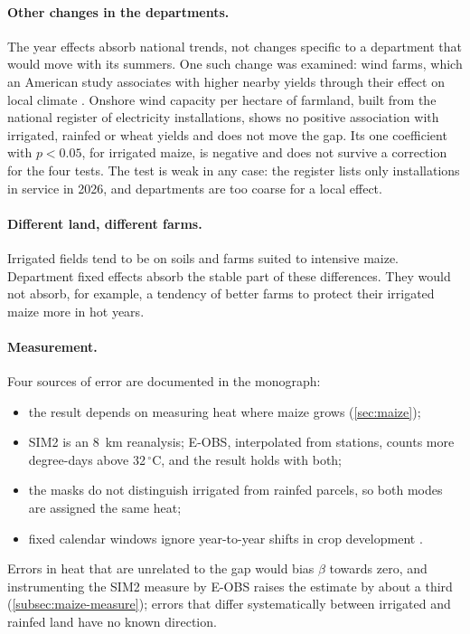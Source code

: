 \paragraph{Other changes in the departments.} The year effects absorb national trends, not changes specific to a department that would move with its summers. One such change was examined: wind farms, which an American study associates with higher nearby yields through their effect on local climate \parencite{kaffine2019}. Onshore wind capacity per hectare of farmland, built from the national register of electricity installations, shows no positive association with irrigated, rainfed or wheat yields and does not move the gap. Its one coefficient with $p < 0.05$, for irrigated maize, is negative and does not survive a correction for the four tests. The test is weak in any case: the register lists only installations in service in 2026, and departments are too coarse for a local effect.

\paragraph{Different land, different farms.} Irrigated fields tend to be on soils and farms suited to intensive maize. Department fixed effects absorb the stable part of these differences. They would not absorb, for example, a tendency of better farms to protect their irrigated maize more in hot years.

\paragraph{Measurement.} Four sources of error are documented in the monograph:
\begin{itemize}
  \item the result depends on measuring heat where maize grows (\cref{sec:maize});
  \item SIM2 is an 8~km reanalysis; E-OBS, interpolated from stations, counts more degree-days above 32\,$^{\circ}$C, and the result holds with both;
  \item the masks do not distinguish irrigated from rainfed parcels, so both modes are assigned the same heat;
  \item fixed calendar windows ignore year-to-year shifts in crop development \parencite{leroux2024}.
\end{itemize}
Errors in heat that are unrelated to the gap would bias $\beta$ towards zero, and instrumenting the SIM2 measure by E-OBS raises the estimate by about a third (\cref{subsec:maize-measure}); errors that differ systematically between irrigated and rainfed land have no known direction.

